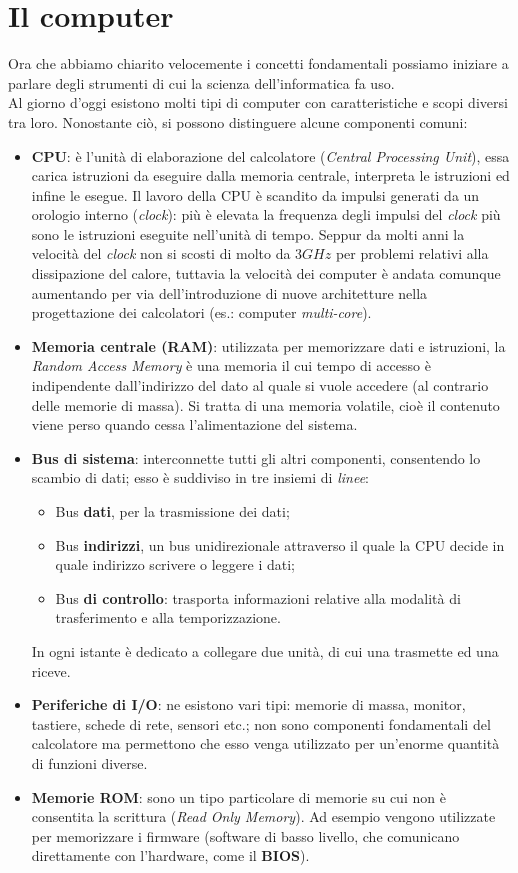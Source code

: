 \section{Il computer}
Ora che abbiamo chiarito velocemente i concetti fondamentali possiamo iniziare a parlare degli strumenti di cui la scienza dell'informatica fa uso. \\
Al giorno d'oggi esistono molti tipi di computer con caratteristiche e scopi diversi tra loro. Nonostante ciò, si possono distinguere alcune componenti comuni:
\begin{itemize}
	\item\textbf{CPU}: è l’unità di elaborazione del calcolatore (\textit{Central Processing Unit}), essa carica istruzioni da eseguire dalla memoria centrale, interpreta le istruzioni ed infine le esegue.
	Il lavoro della CPU è scandito da impulsi generati da un orologio interno (\textit{clock}): più è elevata la frequenza degli impulsi del \textit{clock} più sono le istruzioni eseguite nell’unità di tempo. Seppur da molti anni la velocità del \textit{clock} non si scosti di molto da $3\unit{GHz}$ per problemi relativi alla dissipazione del calore, tuttavia la velocità dei computer è andata comunque aumentando per via dell'introduzione di nuove architetture nella progettazione dei calcolatori (es.: computer \textit{multi-core}).
	\item\textbf{Memoria centrale (RAM)}: utilizzata per memorizzare dati e istruzioni, la \textit{Random Access Memory} è una memoria il cui tempo di accesso è indipendente dall’indirizzo del dato al quale si vuole accedere (al contrario delle memorie di massa). Si tratta di una memoria volatile, cioè il contenuto viene perso quando cessa l’alimentazione del sistema.
	\item\textbf{Bus di sistema}: interconnette tutti gli altri componenti, consentendo lo scambio di dati; esso è suddiviso in tre insiemi di \textit{linee}: 
	\begin{itemize}[noitemsep, nolistsep]
		\item Bus \textbf{dati}, per la trasmissione dei dati; 
		\item Bus \textbf{indirizzi}, un bus unidirezionale attraverso il quale la CPU decide in quale indirizzo scrivere o leggere i dati;
		\item Bus \textbf{di controllo}: trasporta informazioni relative alla modalità di trasferimento e alla temporizzazione.
	\end{itemize}
	In ogni istante è dedicato a collegare due unità, di cui una trasmette ed una riceve.
	\item\textbf{Periferiche di I/O}: ne esistono vari tipi: memorie di massa, monitor, tastiere, schede di rete, sensori etc.; non sono componenti fondamentali del calcolatore  ma permettono che esso venga utilizzato per un'enorme quantità di funzioni diverse.
	\item\textbf{Memorie ROM}: sono un tipo particolare di memorie su cui non è consentita la scrittura (\textit{Read Only Memory}). Ad esempio vengono utilizzate per memorizzare i firmware (software di basso livello, che comunicano direttamente con l'hardware, come il \textbf{BIOS}).
	
\end{itemize}

